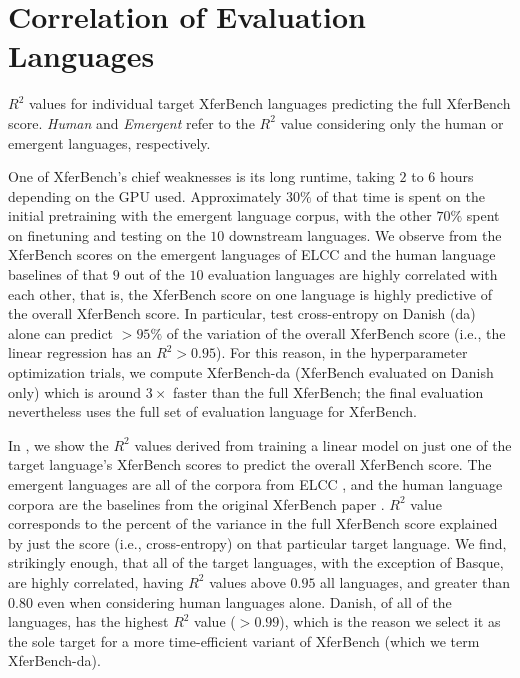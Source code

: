 \section{Correlation of Evaluation Languages}
\unskip\label{hpo:sec:eval-corr}

\begin{table}
  \centering
  \caption{$R^2$ values for individual target XferBench languages predicting the full XferBench score.  \emph{Human} and \emph{Emergent} refer to the $R^2$ value considering only the human or emergent languages, respectively.}
  \unskip\label{tab:target-corr}
\end{table}
One of XferBench's chief weaknesses is its long runtime, taking $2$ to $6$ hours depending on the GPU used.
Approximately $30\%$ of that time is spent on the initial pretraining with the emergent language corpus, with the other $70\%$ spent on finetuning and testing on the $10$ downstream languages.
We observe from the XferBench scores on the emergent languages of ELCC and the human language baselines of \citet{xferbench} that $9$ out of the $10$ evaluation languages are highly correlated with each other, that is, the XferBench score on one language is highly predictive of the overall XferBench score.
In particular, test cross-entropy on Danish (da) alone can predict ${>}95\%$ of the variation of the overall XferBench score (i.e., the linear regression has an $R^2>0.95$).
For this reason, in the hyperparameter optimization trials, we compute XferBench-da (XferBench evaluated on Danish only) which is around $3{\times}$ faster than the full XferBench; the final evaluation nevertheless uses the full set of evaluation language for XferBench.

In , we show the $R^2$ values derived from training a linear model on just one of the target language's XferBench scores to predict the overall XferBench score.
The emergent languages are all of the corpora from ELCC \citep{elcc}, and the human language corpora are the baselines from the original XferBench paper \citep{xferbench}.
$R^2$ value corresponds to the percent of the variance in the full XferBench score explained by just the score (i.e., cross-entropy) on that particular target language.
We find, strikingly enough, that all of the target languages, with the exception of Basque, are highly correlated, having $R^2$ values above $0.95$ all languages, and greater than $0.80$ even when considering human languages alone.
Danish, of all of the languages, has the highest $R^2$ value (${>}0.99$), which is the reason we select it as the sole target for a more time-efficient variant of XferBench (which we term XferBench-da).



